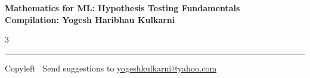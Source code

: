 \documentclass[8pt,landscape]{article}
\begin{document}
\footnotesize


\begin{center}
\Large{\textbf{Mathematics for ML: Hypothesis Testing Fundamentals\\ Compilation: Yogesh Haribhau Kulkarni}}
\end{center}

\begin{multicols}{3}

\end{multicols}

\rule{\linewidth}{0.25pt}
\scriptsize
Copyleft \textcopyleft\  Send suggestions to
\href{http://www.yogeshkulkarni.com}{yogeshkulkarni@yahoo.com}
\end{document}
